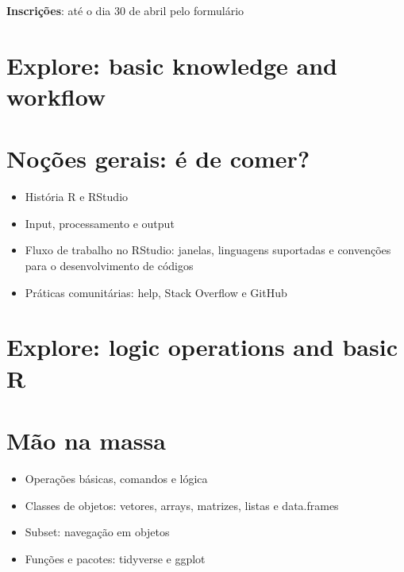\documentclass[a4paper,12pt]{article}
\begin{document}
\vspace{0.5cm}

\textbf{Inscrições}: até o dia 30 de abril pelo formulário 



\section{Explore: basic knowledge and workflow}
\section*{Noções gerais: é de comer?}

\begin{itemize}
    \item História R e RStudio \cite{ihaka1996}\cite{ihaka1998}

    \item Input, processamento e output

    \item Fluxo de trabalho no RStudio: janelas, linguagens suportadas e convenções para o desenvolvimento de códigos

    \item Práticas comunitárias: help, Stack Overflow e GitHub
\end{itemize}


\section{Explore: logic operations and basic R}
\section*{Mão na massa}

\begin{itemize}
    \item Operações básicas, comandos e lógica

    \item Classes de objetos: vetores, arrays, matrizes, listas e data.frames

    \item Subset: navegação em objetos

    \item Funções e pacotes: tidyverse e ggplot
\end{itemize}
\end{document}

